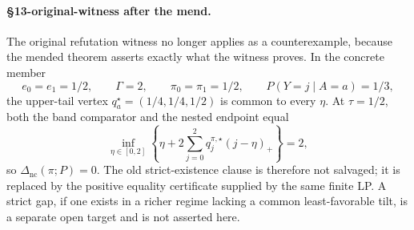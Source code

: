 \paragraph{\S13-original-witness after the mend.}
The original refutation witness no longer applies as a counterexample, because the mended theorem
asserts exactly what the witness proves.  In the concrete member
\[
e_0=e_1=1/2,\qquad \Gamma=2,\qquad \pi_0=\pi_1=1/2,\qquad
P(Y=j\mid A=a)=1/3,
\]
the upper-tail vertex \(q_a^\star=(1/4,1/4,1/2)\) is common to every \(\eta\).  At
\(\tau=1/2\), both the band comparator and the nested endpoint equal
\[
\inf_{\eta\in[0,2]}
\left\{\eta+2\sum_{j=0}^2q^{\pi,\star}_j(j-\eta)_+\right\}
=2,
\]
so \(\Delta_{\mathrm{nc}}(\pi;P)=0\).  The old strict-existence clause is therefore not salvaged;
it is replaced by the positive equality certificate supplied by the same finite LP.  A strict gap,
if one exists in a richer regime lacking a common least-favorable tilt, is a separate open target
and is not asserted here.
